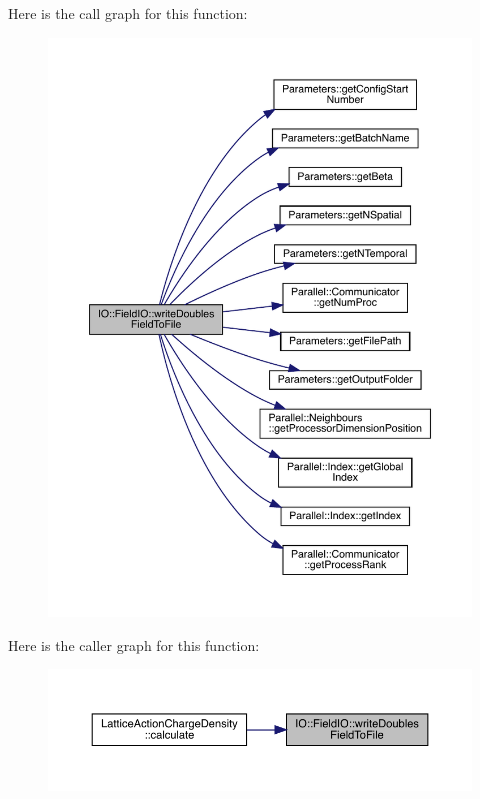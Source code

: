 Here is the call graph for this function\+:\nopagebreak
\begin{figure}[H]
\begin{center}
\leavevmode
\includegraphics[width=350pt]{class_i_o_1_1_field_i_o_a4bfe0fd7890fe69b88fbbe3864fd00ae_cgraph}
\end{center}
\end{figure}
Here is the caller graph for this function\+:\nopagebreak
\begin{figure}[H]
\begin{center}
\leavevmode
\includegraphics[width=350pt]{class_i_o_1_1_field_i_o_a4bfe0fd7890fe69b88fbbe3864fd00ae_icgraph}
\end{center}
\end{figure}
\mbox{\label{class_i_o_1_1_field_i_o_a44dc4aa1786974c091082c5b37be73a1}} 

